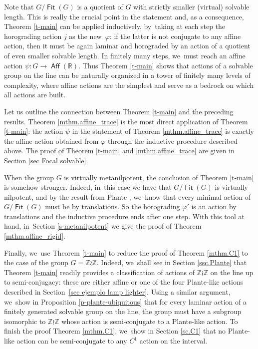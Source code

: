 \documentclass[JEP,XML,SOM,Unicode,NoFloatCountersInSection,published]{cedram}
\theoremstyle{definition}
\DeclareMathOperator{\Aff}{\mathsf{Aff}}
\DeclareMathOperator{\Fit}{\mathsf{Fit}}
\newcommand{\R}{\mathbb{R}}
\newcommand{\Z}{\mathbb Z}
\begin{document}
Note that $G/\Fit(G)$ is a quotient of $G$ with strictly smaller (virtual) solvable length. This is really the crucial point in the statement and, as a consequence, Theorem \ref{t-main} can be applied inductively, by~taking at each step the horograding action $j$ as the new~$\varphi$: if the latter is not conjugate to any affine action, then it must be again laminar and horograded by an action of a quotient of even smaller solvable length. In finitely many steps, we~must reach an affine action $\psi\colon G\to \Aff(\R)$. Thus Theorem \ref{t-main} shows that actions of a solvable group on the line can be naturally organized in a tower of finitely many levels of complexity, where affine actions are the simplest and serve as a bedrock on which all actions are built.

Let us outline the connection between Theorem \ref{t-main} and the preceding results.
Theorem \ref{mthm.affine_trace} is the most direct application of Theorem \ref{t-main}: the action $\psi$ in the statement of Theorem \ref{mthm.affine_trace} is exactly the affine action obtained from $\varphi$ through the inductive procedure described above. The proof of Theorem \ref{t-main} and \ref{mthm.affine_trace} are given in Section \ref{sec Focal solvable}.

When the group $G$ is virtually metanilpotent, the conclusion of Theorem \ref{t-main} is somehow stronger. Indeed, in~this case we have that $G/\Fit(G)$ is virtually nilpotent, and by the result from Plante \cite{PlanteMeasure}, we~know that every minimal action of $G/\Fit(G)$ must be by translations. So the horograding $\varphi'$ is an action by translations and the inductive procedure ends after one step. With this tool at hand, in~Section \ref{s-metanilpotent} we give the proof of Theorem \ref{mthm.affine_rigid}.

Finally, we~use Theorem \ref{t-main} to reduce the proof of Theorem \ref{mthm.C1} to the case of the group $G=\Z \wr \Z$. Indeed, we~shall see in Section \ref{ssc.Plante} that Theorem \ref{t-main} readily provides a classification of actions of $\Z \wr \Z$ on the line up to semi-conjugacy: these are either affine or one of the four Plante-like actions described in Section~\ref{sec ejemplo lamp lighter}. Using a similar argument, we~show in Proposition \ref{p-plante-ubiquitous} that for every laminar action of a finitely generated solvable group on the line, the group must have a subgroup isomorphic to $\Z \wr \Z$ whose action is semi-conjugate to a Plante-like action. To finish the proof Theorem \ref{mthm.C1}, we~show in Section \ref{sc.C1} that no Plante-like action can be semi-conjugate to any $C^1$ action on the interval.
\end{document}
